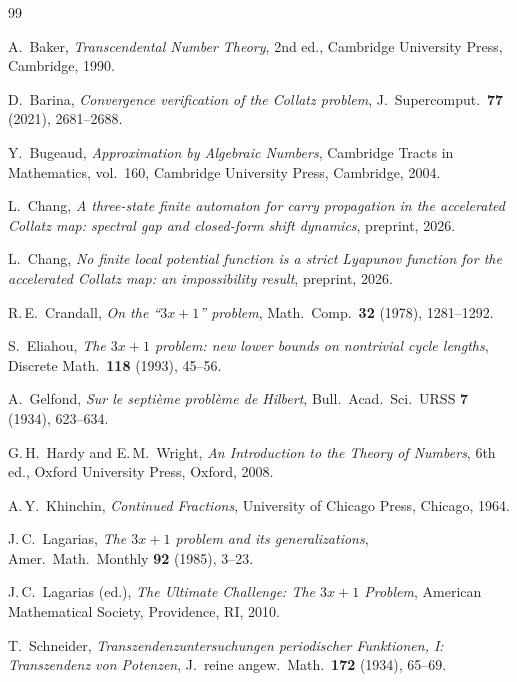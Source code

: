 \documentclass[11pt,a4paper]{article}
\theoremstyle{definition}
\theoremstyle{remark}
\begin{document}
\begin{thebibliography}{99}

A.~Baker,
\emph{Transcendental Number Theory},
2nd ed., Cambridge University Press, Cambridge, 1990.

D.~Barina,
\emph{Convergence verification of the Collatz problem},
J.\ Supercomput.\ \textbf{77} (2021), 2681--2688.

Y.~Bugeaud,
\emph{Approximation by Algebraic Numbers},
Cambridge Tracts in Mathematics, vol.~160, Cambridge University
Press, Cambridge, 2004.

L.~Chang,
\emph{A three-state finite automaton for carry propagation in the
accelerated Collatz map: spectral gap and closed-form shift dynamics},
preprint, 2026.

L.~Chang,
\emph{No finite local potential function is a strict Lyapunov
function for the accelerated Collatz map: an impossibility result},
preprint, 2026.

R.\,E.~Crandall,
\emph{On the ``$3x+1$'' problem},
Math.\ Comp.\ \textbf{32} (1978), 1281--1292.

S.~Eliahou,
\emph{The $3x+1$ problem: new lower bounds on nontrivial cycle lengths},
Discrete Math.\ \textbf{118} (1993), 45--56.

A.~Gelfond,
\emph{Sur le septi\`eme probl\`eme de Hilbert},
Bull.\ Acad.\ Sci.\ URSS \textbf{7} (1934), 623--634.

G.\,H.~Hardy and E.\,M.~Wright,
\emph{An Introduction to the Theory of Numbers},
6th ed., Oxford University Press, Oxford, 2008.

A.\,Y.~Khinchin,
\emph{Continued Fractions},
University of Chicago Press, Chicago, 1964.

J.\,C.~Lagarias,
\emph{The $3x+1$ problem and its generalizations},
Amer.\ Math.\ Monthly \textbf{92} (1985), 3--23.

J.\,C.~Lagarias (ed.),
\emph{The Ultimate Challenge: The $3x+1$ Problem},
American Mathematical Society, Providence, RI, 2010.

T.~Schneider,
\emph{Transzendenzuntersuchungen periodischer Funktionen, I:
Transzendenz von Potenzen},
J.\ reine angew.\ Math.\ \textbf{172} (1934), 65--69.


\end{thebibliography}
\end{document}
